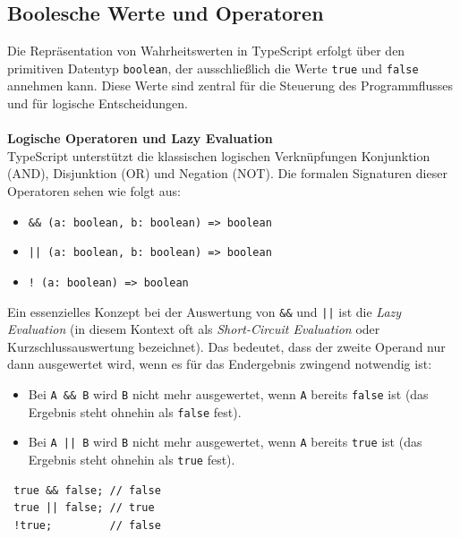 \subsection{Boolesche Werte und Operatoren}
\label{subsec:bool}
Die Repräsentation von Wahrheitswerten in TypeScript erfolgt über den primitiven Datentyp \texttt{boolean}, der ausschließlich die Werte \texttt{true} und \texttt{false} annehmen kann. Diese Werte sind zentral für die Steuerung des Programmflusses und für logische Entscheidungen.\\ \\
\textbf{Logische Operatoren und Lazy Evaluation}\\
TypeScript unterstützt die klassischen logischen Verknüpfungen Konjunktion (AND), Disjunktion (OR) und Negation (NOT). Die formalen Signaturen dieser Operatoren sehen wie folgt aus:
\begin{itemize}
	\item \texttt{\&\& (a: boolean, b: boolean) => boolean}
	\item \texttt{|| (a: boolean, b: boolean) => boolean}
	\item \texttt{! (a: boolean) => boolean}
\end{itemize}

Ein essenzielles Konzept bei der Auswertung von \texttt{\&\&} und \texttt{||} ist die \textit{Lazy Evaluation} (in diesem Kontext oft als \textit{Short-Circuit Evaluation} oder Kurzschlussauswertung bezeichnet). Das bedeutet, dass der zweite Operand nur dann ausgewertet wird, wenn es für das Endergebnis zwingend notwendig ist:
\begin{itemize}
	\item Bei \texttt{A \&\& B} wird \texttt{B} nicht mehr ausgewertet, wenn \texttt{A} bereits \texttt{false} ist (das Ergebnis steht ohnehin als \texttt{false} fest).
	\item Bei \texttt{A || B} wird \texttt{B} nicht mehr ausgewertet, wenn \texttt{A} bereits \texttt{true} ist (das Ergebnis steht ohnehin als \texttt{true} fest).
\end{itemize}

\begin{verbatim}
 true && false; // false
 true || false; // true
 !true;         // false
\end{verbatim}


